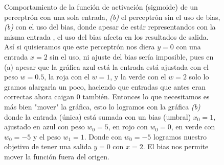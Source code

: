 \begin{figure}[h]
    \caption[Impacto del bias]{
     Comportamiento de la función de activación (sigmoide) de un perceptrón con una sola entrada, \emph{(b)} el perceptrón sin el uso de bias, \emph{(b)} con el uso del bias, donde apesar de estár representandos con la misma entrada , el uso del bias afecta en los resultados de salida. Así si quisieramos que este perceptrón nos diera $y = 0$ con una entrada $x= 2$ sin el uso, ni ajuste del bias sería imposible, pues en (a) apesar que la gráfica azul está la entrada está ajustada con el peso $w=0.5$, la roja con el $w=1$, y la verde con el $w=2$  solo lo gramos alargarla un poco, haciendo que entradas que antes eran correctas ahora caigan $0$ también. Entonces lo que necesitamos es más bien "mover" la gráfica, esto lo logramos con la gráfica \emph{(b)} donde la entrada (única) está sumada con un bias (umbral) $x_{0}= 1$, ajustado en azul con peso $w_{0}= 5$, en rojo con $w_{0}= 0$, en verde con $w_{0}= -5$ y el peso $w_{1}=1$. Donde con $w_{0}= -5$ logramos nuestro objetivo de tener una salida $y=0$ con $x=2$. El bias nos permite mover la función fuera del origen.
     \label{fig:sigmoideBias}
     }
\end{figure}


